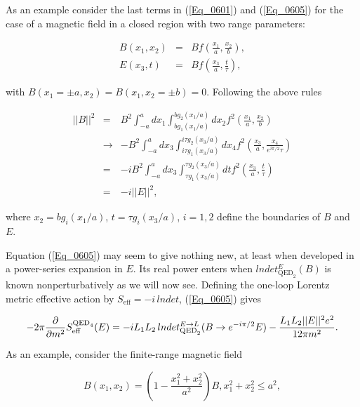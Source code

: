 \documentclass[a4paper,twocolumn,showpacs,preprintnumbers,amsmath,amssymb]{revtex4}
\newcommand{\pdo}[1]{\ensuremath{\frac{\partial }
        {\partial #1 }}}
\begin{document}
\noindent
As an example consider the last terms in (\ref{Eq_0601}) and
(\ref{Eq_0605}) for the case of a magnetic field in a closed region
with two range parameters:

\begin{eqnarray}
\label{Eq_0606}
\nonumber
B(x_1, x_2) &=& B f\left(\frac{x_1}{a}, \frac{x_2}{b}\right),\\
E(x_3,t)    &=& B f\left(\frac{x_3}{a}, \frac{t}{\tau}\right),
\end{eqnarray}

\noindent
with $B(x_1 = \pm a, x_2 ) = B(x_1, x_2 = \pm b) = 0$. Following the
above rules

\begin{eqnarray}
\label{Eq_0607}
\nonumber
||B||^2
  &=& B^2 \int^a_{-a} dx_1 \int^{b g_2(x_1/a)}_{b g_1(x_1/a)}
      dx_2 f^2 \left(\frac{x_1}{a}, \frac{x_2}{b}\right)\\
\nonumber
  &\to& -B^2 \int^a_{-a} dx_3 \int^{i \tau g_2(x_3/a)}_{i\tau g_1(x_3/a)}
      dx_4 f^2 \left(\frac{x_3}{a}, \frac{x_4}{e^{i\pi/2} \tau}\right)\\
\nonumber
  &=& -i B^2 \int^{a}_{-a} dx_3 \int^{\tau g_2(x_3/a)}_{\tau g_1(x_3/a)}
      dt f^2 \left( \frac{x_3}{a}, \frac{t}{\tau}\right)\\
  &=& -i ||E||^2,
\end{eqnarray}

\noindent
where $x_2 = b g_i(x_1/a)$, $t = \tau g_i(x_3/a)$, $i = 1, 2$ define
the boundaries of $B$ and $E$.

Equation (\ref{Eq_0605}) may seem to give nothing new, at least when
developed in a power-series expansion in $E$. Its real power enters when
$lndet^E_{\text{QED}_2}(B)$ is known nonperturbatively as we will now
see. Defining the one-loop Lorentz metric effective action by
$S_\text{eff} = -i \, lndet$, (\ref{Eq_0605}) gives

\begin{widetext}
\begin{equation}
\label{Eq_0608}
-2\pi \pdo{m^2} S^{\text{QED}_4}_{\text{eff}}(E)
  = - i L_1 L_2 \, lndet^{E \to L}_{\text{QED}_2} (B \to e^{-i\pi/2} E)\\
    - \frac{L_1 L_2 ||E||^2 e^2}{12 \pi m^2}.
\end{equation}
\end{widetext}

\noindent
As an example, consider the finite-range magnetic field

\begin{equation}
\label{Eq_0609}
B(x_1, x_2) = \left( 1 - \frac{x^2_1 + x^2_2}{a^2} \right) B,
  x^2_1 + x^2_2 \le a^2,
\end{equation}
\end{document}
